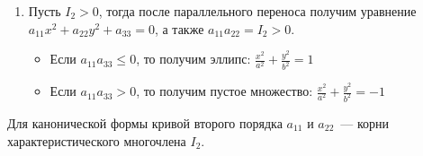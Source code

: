 \begin{enumerate}
	\item Пусть $I_2 > 0$, тогда после параллельного переноса получим уравнение $a_{11} x^2 + a_{22} y^2 + a_{33} = 0$, а также $a_{11} a_{22} = I_2 > 0$.
	\begin{itemize}
		\item Если $a_{11} a_{33} \leqslant 0$, то получим эллипс:
		$\displaystyle \frac{x^2}{a^2} + \frac{y^2}{b^2} = 1$
		\item Если $a_{11} a_{33} > 0$, то получим пустое множество:
		$\displaystyle \frac{x^2}{a^2} + \frac{y^2}{b^2} = -1$
	\end{itemize}
\end{enumerate}

\begin{theorem}
Для канонической формы кривой второго порядка $a_{11}$ и $a_{22}$~--- корни характеристического многочлена $I_2$.
\end{theorem}